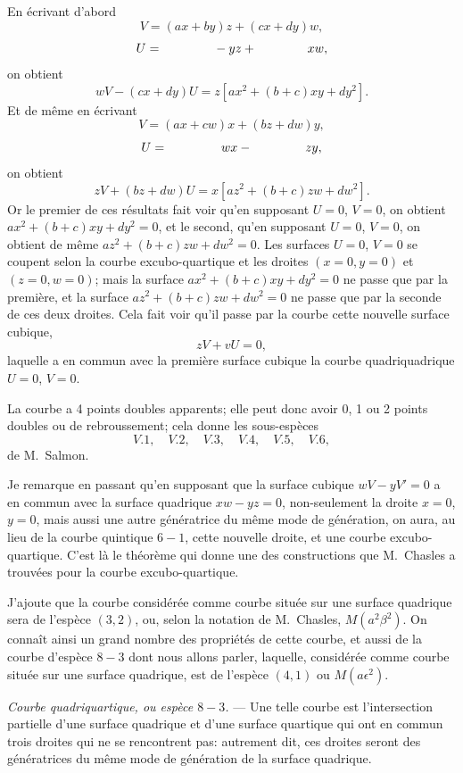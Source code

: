\documentclass[11pt,a4paper]{article}
\begin{document}
\clearpage

En \'{e}crivant d'abord
\[
V = (ax + by)z + (cx + dy)w,
\]
\[
U = \hphantom{(ax + by)} - yz + \hphantom{(cx + dy)} xw,
\]
on obtient
\[
wV - (cx + dy)U = z[ax^2 + (b+c)xy + dy^2].
\]
Et de m\^{e}me en \'{e}crivant
\[
V = (ax + cw)x + (bz + dw)y,
\]
\[
U = \hphantom{(ax + cw)} wx - \hphantom{(bz + dw)} zy,
\]
on obtient
\[
zV + (bz + dw)U = x[az^2 + (b+c)zw + dw^2].
\]
Or le premier de ces r\'{e}sultats fait voir qu'en supposant $U = 0$, $V = 0$, on obtient $ax^2 + (b+c)xy + dy^2 = 0$, et le second, qu'en supposant $U = 0$, $V = 0$, on obtient de m\^{e}me $az^2 + (b+c)zw + dw^2 = 0$. Les surfaces $U = 0$, $V = 0$ se coupent selon la courbe excubo-quartique et les droites $(x = 0, y = 0)$ et $(z = 0, w = 0)$; mais la surface $ax^2 + (b+c)xy + dy^2 = 0$ ne passe que par la premi\`{e}re, et la surface $az^2 + (b+c)zw + dw^2 = 0$ ne passe que par la seconde de ces deux droites. Cela fait voir qu'il passe par la courbe cette nouvelle surface cubique,
\[
zV + vU = 0,
\]
laquelle a en commun avec la premi\`{e}re surface cubique la courbe quadriquadrique $U = 0$, $V = 0$.

La courbe a 4 points doubles apparents; elle peut donc avoir 0, 1 ou 2 points doubles ou de rebroussement; cela donne les sous-esp\`{e}ces
\[
V.1, \quad V.2, \quad V.3, \quad V.4, \quad V.5, \quad V.6,
\]
de M.~Salmon.

Je remarque en passant qu'en supposant que la surface cubique $wV - yV' = 0$ a en commun avec la surface quadrique $xw - yz = 0$, non-seulement la droite $x = 0$, $y = 0$, mais aussi une autre g\'{e}n\'{e}ratrice du m\^{e}me mode de g\'{e}n\'{e}ration, on aura, au lieu de la courbe quintique $6 - 1$, cette nouvelle droite, et une courbe excubo-quartique. C'est l\`{a} le th\'{e}or\`{e}me qui donne une des constructions que M.~Chasles a trouv\'{e}es pour la courbe excubo-quartique.

J'ajoute que la courbe consid\'{e}r\'{e}e comme courbe situ\'{e}e sur une surface quadrique sera de l'esp\`{e}ce $(3, 2)$, ou, selon la notation de M.~Chasles, $M(a^2\beta^2)$. On conna\^{i}t ainsi un grand nombre des propri\'{e}t\'{e}s de cette courbe, et aussi de la courbe d'esp\`{e}ce $8 - 3$ dont nous allons parler, laquelle, consid\'{e}r\'{e}e comme courbe situ\'{e}e sur une surface quadrique, est de l'esp\`{e}ce $(4, 1)$ ou $M(a\epsilon^2)$.

\medskip
\noindent\textit{Courbe quadriquartique, ou esp\`{e}ce $8 - 3$.} --- Une telle courbe est l'intersection partielle d'une surface quadrique et d'une surface quartique qui ont en commun trois droites qui ne se rencontrent pas: autrement dit, ces droites seront des g\'{e}n\'{e}ratrices du m\^{e}me mode de g\'{e}n\'{e}ration de la surface quadrique.
\end{document}
